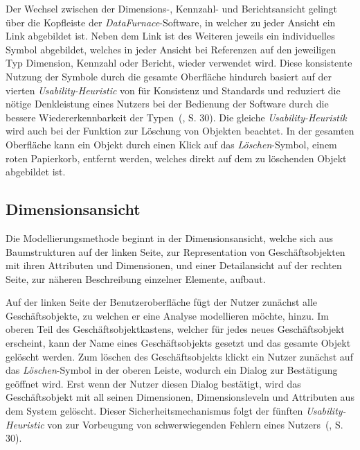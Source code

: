 \documentclass[
  language=german, %
  type=bachelor%
]{isthesis}
\begin{document}
\begin{content}
  Der Wechsel zwischen der Dimensions-, Kennzahl- und Berichtsansicht gelingt
  über die Kopfleiste der \textit{DataFurnace}-Software, in welcher zu jeder
  Ansicht ein Link abgebildet ist. Neben dem Link ist des Weiteren jeweils ein
  individuelles Symbol abgebildet, welches in jeder Ansicht bei Referenzen auf
  den jeweiligen Typ Dimension, Kennzahl oder Bericht, wieder verwendet wird.
  Diese konsistente Nutzung der Symbole durch die gesamte Oberfläche hindurch
  basiert auf der vierten \textit{Usability-Heuristic} von
  \textsc{\citeauthor{nielsen1994heuristic}} für Konsistenz und Standards und
  reduziert die nötige Denkleistung eines Nutzers bei der Bedienung der
  Software durch die bessere Wiedererkennbarkeit der
  Typen~(\citeyear{nielsen1994heuristic}, S. 30).  Die gleiche
  \textit{Usability-Heuristik} wird auch bei der Funktion zur Löschung von
  Objekten beachtet. In der gesamten Oberfläche kann ein Objekt durch einen
  Klick auf das \textit{Löschen}-Symbol, einem roten Papierkorb, entfernt
  werden, welches direkt auf dem zu löschenden Objekt abgebildet ist.


  \subsection{Dimensionsansicht}

  Die Modellierungsmethode beginnt in der Dimensionsansicht, welche sich aus
  Baumstrukturen auf der linken Seite, zur Representation von
  Geschäftsobjekten mit ihren Attributen und Dimensionen, und einer
  Detailansicht auf der rechten Seite, zur näheren Beschreibung einzelner
  Elemente, aufbaut. 

  Auf der linken Seite der Benutzeroberfläche fügt der Nutzer zunächst alle
  Geschäftsobjekte, zu welchen er eine Analyse modellieren möchte, hinzu. Im
  oberen Teil des Geschäftsobjektkastens, welcher für jedes neues Geschäftsobjekt erscheint, kann
  der Name eines Geschäftsobjekts gesetzt und das gesamte Objekt gelöscht
  werden. Zum löschen des Geschäftsobjekts klickt ein Nutzer zunächst auf das
  \textit{Löschen}-Symbol in der oberen Leiste, wodurch ein Dialog zur
  Bestätigung geöffnet wird. Erst wenn der Nutzer diesen Dialog bestätigt, wird
  das Geschäftsobjekt mit all seinen Dimensionen, Dimensionsleveln und
  Attributen aus dem System gelöscht. Dieser Sicherheitsmechanismus folgt der
  fünften \textit{Usability-Heuristic} von
  \textsc{\citeauthor{nielsen1994heuristic}} zur Vorbeugung von schwerwiegenden
  Fehlern eines Nutzers~(\citeyear{nielsen1994heuristic}, S. 30).


\end{content}
\end{document}
